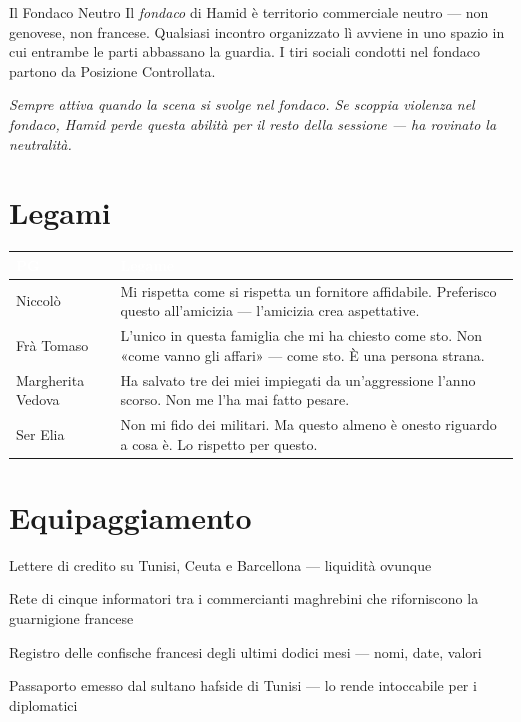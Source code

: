 
\begin{fieschibox}{Il Fondaco Neutro}
  Il \textit{fondaco} di Hamid è territorio commerciale neutro — non
  genovese, non francese. Qualsiasi incontro organizzato lì avviene
  in uno spazio in cui entrambe le parti abbassano la guardia.
  I tiri sociali condotti nel fondaco partono da Posizione Controllata.

  \medskip\noindent\textit{Sempre attiva quando la scena si svolge nel
  fondaco. Se scoppia violenza nel fondaco, Hamid perde questa abilità
  per il resto della sessione — ha rovinato la neutralità.}
\end{fieschibox}

\section*{Legami}

\begin{table}[h]
\centering\renewcommand{\arraystretch}{1.4}
\begin{tabularx}{\linewidth}{@{}L{2.6cm} X@{}}
  \toprule{}
  \textcolor{white}{\textbf{PG}} & \textcolor{white}{\textbf{Legame}} \\
  \midrule
  Niccolò & Mi rispetta come si rispetta un fornitore affidabile. Preferisco
           questo all'amicizia — l'amicizia crea aspettative. \\
  Frà Tomaso & L'unico in questa famiglia che mi ha chiesto come sto.
              Non «come vanno gli affari» — come sto. È una persona strana. \\
  Margherita Vedova & Ha salvato tre dei miei impiegati da un'aggressione
                     l'anno scorso. Non me l'ha mai fatto pesare. \\
  Ser Elia & Non mi fido dei militari. Ma questo almeno è onesto riguardo
            a cosa è. Lo rispetto per questo. \\
  \bottomrule
\end{tabularx}
\end{table}

\section*{Equipaggiamento}
\begin{goldlist}
  \item Lettere di credito su Tunisi, Ceuta e Barcellona — liquidità ovunque
  \item Rete di cinque informatori tra i commercianti maghrebini che riforniscono la guarnigione francese
  \item Registro delle confische francesi degli ultimi dodici mesi — nomi, date, valori
  \item Passaporto emesso dal sultano hafside di Tunisi — lo rende intoccabile per i diplomatici
\end{goldlist}

